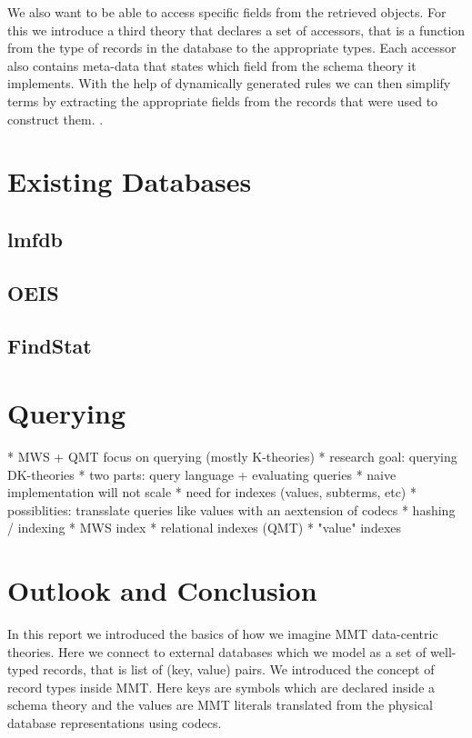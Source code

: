 \documentclass{deliverablereport}
\begin{document}
We also want to be able to access specific fields from the retrieved objects. For this we introduce a third theory that declares a set of accessors, that is a function from the type of records in the database to the appropriate types. Each accessor also contains meta-data that states which field from the schema theory it implements. With the help of dynamically generated rules we can then simplify terms by extracting the appropriate fields from the records that were used to construct them. .


\section{Existing Databases}\label{sec:lmfdb}

\subsection{lmfdb}
\subsection{OEIS}
\subsection{FindStat}

\section{Querying}

* MWS + QMT focus on querying (mostly K-theories)
* research goal: querying DK-theories
  * two parts: query language + evaluating queries
  * naive implementation will not scale
  * need for indexes (values, subterms, etc)
  * possiblities: transslate queries like values with an aextension of codecs
  * hashing / indexing
    * MWS index
    * relational indexes (QMT)
    * "value" indexes

\section{Outlook and Conclusion}\label{sec:conclusion}

In this report we introduced the basics of how we imagine MMT data-centric theories. Here we connect to external databases which we model as a set of well-typed records, that is list of (key, value) pairs. We introduced the concept of record types inside MMT. Here keys are symbols which are declared inside a schema theory and the values are MMT literals translated from the physical database representations using codecs.
\end{document}
